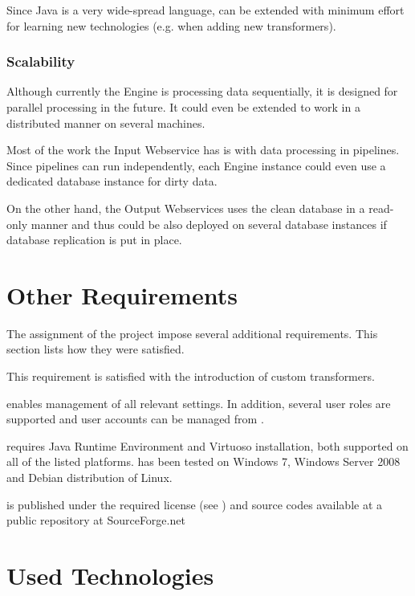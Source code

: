 Since Java is a very wide-spread language, \odcs can be extended with minimum effort for learning new technologies (e.g. when adding new transformers).

\subsubsection{Scalability}
 Although currently the Engine is processing data sequentially, it is designed for parallel processing in the future. It could even be extended to work in a distributed manner on several machines.

 Most of the work the Input Webservice has is with data processing in pipelines. Since pipelines can run independently, each Engine instance could even use a dedicated database instance for dirty data.

 On the other hand, the Output Webservices uses the clean database in a read-only manner and thus could be also deployed on several database instances if database replication is put in place.

\section{Other Requirements}
The assignment of the project impose several additional requirements. This section lists how they were satisfied.

 This requirement is satisfied with the introduction of custom transformers.

 \FE enables management of all relevant settings. In addition, several user roles are supported and user accounts can be managed from \FE.

 \odcs requires Java Runtime Environment and Virtuoso installation, both supported on all of the listed platforms. \odcs has been tested on Windows 7, Windows Server 2008 and Debian distribution of Linux.

 \odcs is published under the required license (see ) and source codes available at a public repository at SourceForge.net

\section{Used Technologies}


